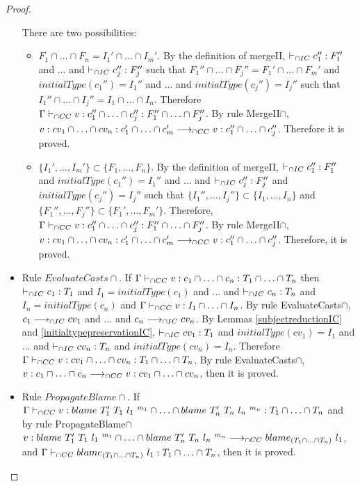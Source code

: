 \documentclass[a4paper]{article}
\begin{document}
\begin{proof}
\begin{itemize}
    There are two possibilities:
    \begin{itemize}
        \item $F_1 \cap \ldots \cap F_n = I_1' \cap \ldots \cap I_m'$.
        By the definition of mergeII, $\vdash_{\cap IC} c_1'' : F_1''$ and ... and $\vdash_{\cap IC} c_j'' : F_j''$ such that $F_1'' \cap \ldots \cap F_j'' = F_1' \cap \ldots \cap F_m'$ and $initialType(c_1'') = I_1''$ and ... and $initialType(c_j'') = I_j''$ such that $I_1'' \cap \ldots \cap I_j'' = I_1 \cap \ldots \cap I_n$.
        Therefore $\Gamma \vdash_{\cap CC} v : c_1'' \cap \ldots \cap c_j'' : F_1'' \cap \ldots \cap F_j''$.
        By rule MergeII$\cap$, $v : cv_1 \cap \ldots \cap cv_n : c_1' \cap \ldots \cap c_m' \longrightarrow_{\cap CC} v : c_1'' \cap \ldots \cap c_j''$.
        Therefore it is proved.
        \item $\{I_1', \ldots, I_m'\} \subset \{F_1, \ldots, F_n\}$.
        By the definition of mergeII, $\vdash_{\cap IC} c_1'' : F_1''$ and $initialType(c_1'') = I_1''$ and ... and $\vdash_{\cap IC} c_j'' : F_j''$ and $initialType(c_j'') = I_j''$ such that $\{I_1'', \ldots, I_j''\} \subset \{I_1, \ldots, I_n\}$ and $\{F_1'', \ldots, F_j''\} \subset \{F_1', \ldots, F_m'\}$.
        Therefore, $\Gamma \vdash_{\cap CC} v : c_1'' \cap \ldots \cap c_j'' : F_1'' \cap \ldots \cap F_j''$.
        By rule MergeII$\cap$, $v : cv_1 \cap \ldots \cap cv_n : c_1' \cap \ldots \cap c_m' \longrightarrow_{\cap CC} v : c_1'' \cap \ldots \cap c_j''$.
        Therefore, it is proved.
    \end{itemize}
    \item Rule $EvaluateCasts{\cap}$.
    If $\Gamma \vdash_{\cap CC} v : c_1 \cap \ldots \cap c_n : T_1 \cap \ldots \cap T_n$ then $\vdash_{\cap IC} c_1 : T_1$ and $I_1 = initialType(c_1)$ and ... and $\vdash_{\cap IC} c_n : T_n$ and $I_n = initialType(c_n)$ and $\Gamma \vdash_{\cap CC} v : I_1 \cap \ldots \cap I_n$.
    By rule EvaluateCasts$\cap$, $c_1 \longrightarrow_{\cap IC} cv_1$ and ... and $c_n \longrightarrow_{\cap IC} cv_n$.
    By Lemmas \ref{subjectreductionIC} and \ref{initialtypepreservationIC}, $\vdash_{\cap IC} cv_1 : T_1$ and $initialType(cv_1) = I_1$ and ... and $\vdash_{\cap IC} cv_n : T_n$ and $initialType(cv_n) = I_n$.
    Therefore $\Gamma \vdash_{\cap CC} v : cv_1 \cap \ldots \cap cv_n : T_1 \cap \ldots \cap T_n$.
    By rule EvaluateCasts$\cap$, $v : c_1 \cap \ldots \cap c_n \longrightarrow_{\cap CC} v : cv_1 \cap \ldots \cap cv_n$, then it is proved.
    \item Rule $PropagateBlame{\cap}$.
    If $\Gamma \vdash_{\cap CC} v : blame\ T_1'\ T_1\ l_1\ ^{m_1} \cap \ldots \cap blame\ T_n'\ T_n\ l_n\ ^{m_n} : T_1 \cap \ldots \cap T_n$ and by rule PropagateBlame$\cap$ $v : blame\ T_1'\ T_1\ l_1\ ^{m_1} \cap \ldots \cap blame\ T_n'\ T_n\ l_n\ ^{m_n} \longrightarrow_{\cap CC} blame_{(T_1 \cap \ldots \cap T_n)}\ l_1$, and $\Gamma \vdash_{\cap CC} blame_{(T_1 \cap \ldots \cap T_n)}\ l_1 : T_1 \cap \ldots \cap T_n$, then it is proved.

\end{itemize}
\end{proof}
\end{document}
